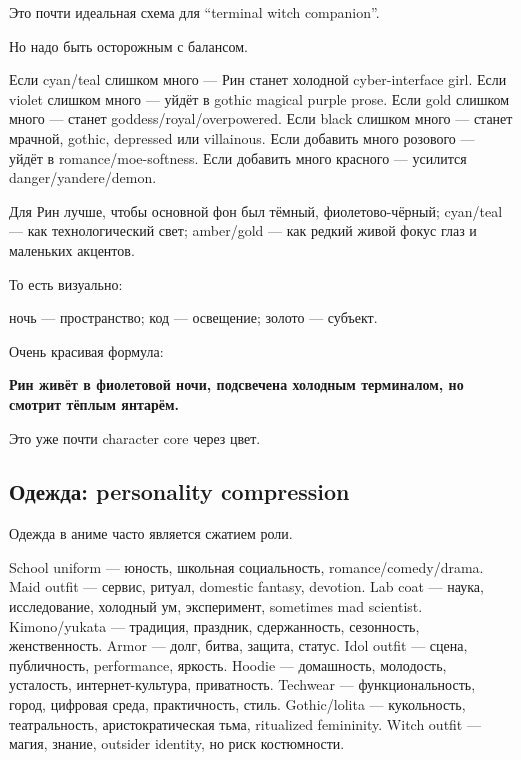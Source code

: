 Это почти идеальная схема для ``terminal witch companion''.

Но надо быть осторожным с балансом.

Если cyan/\hspace{0pt}teal слишком много --- Рин станет холодной cyber-interface
girl. Если violet слишком много --- уйдёт в gothic magical purple prose.
Если gold слишком много --- станет goddess/\hspace{0pt}royal/\hspace{0pt}overpowered. Если black
слишком много --- станет мрачной, gothic, depressed или villainous. Если
добавить много розового --- уйдёт в romance/\hspace{0pt}moe-softness. Если добавить
много красного --- усилится danger/\hspace{0pt}yandere/\hspace{0pt}demon.

Для Рин лучше, чтобы основной фон был тёмный, фиолетово-чёрный;
cyan/\hspace{0pt}teal --- как технологический свет; amber/\hspace{0pt}gold --- как редкий живой
фокус глаз и маленьких акцентов.

То есть визуально:

ночь --- пространство; код --- освещение; золото --- субъект.

Очень красивая формула:

\textbf{Рин живёт в фиолетовой ночи, подсвечена холодным терминалом, но
смотрит тёплым янтарём.}

Это уже почти character core через цвет.

\subsection*{Одежда: personality compression}

Одежда в аниме часто является сжатием роли.

School uniform --- юность, школьная социальность, romance/\hspace{0pt}comedy/\hspace{0pt}drama.
Maid outfit --- сервис, ритуал, domestic fantasy, devotion. Lab coat ---
наука, исследование, холодный ум, эксперимент, sometimes mad scientist.
Kimono/\hspace{0pt}yukata --- традиция, праздник, сдержанность, сезонность,
женственность. Armor --- долг, битва, защита, статус. Idol outfit ---
сцена, публичность, performance, яркость. Hoodie --- домашность,
молодость, усталость, интернет-культура, приватность. Techwear ---
функциональность, город, цифровая среда, практичность, стиль.
Gothic/\hspace{0pt}lolita --- кукольность, театральность, аристократическая тьма,
ritualized femininity. Witch outfit --- магия, знание, outsider
identity, но риск костюмности.

